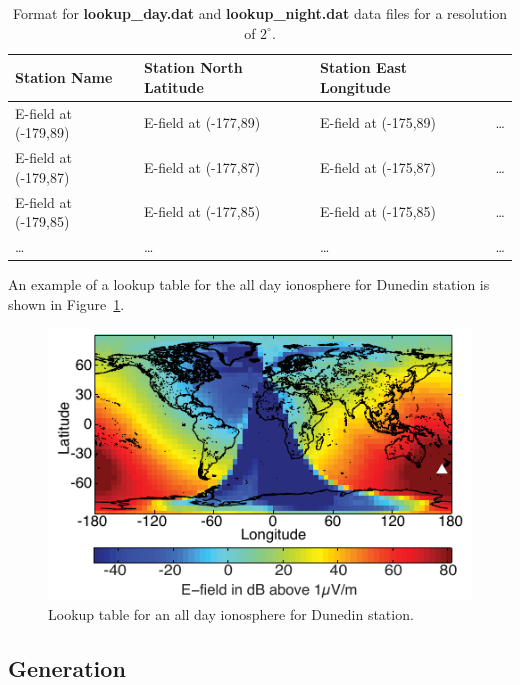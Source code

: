 \begin{table}[h!]
\begin{center}
\begin{tabular}{|p{1.5in}|p{1.75in}|p{1.75in}|p{1in}|}
\hline
\rule{0pt}{3ex}
Station Name	&Station North Latitude	&	Station East Longitude & \\ 
\hline
\rule{0pt}{3ex}
E-field at (-179,89)	& E-field at (-177,89) &	E-field at (-175,89) & \dots \\ 
\hline
\rule{0pt}{3ex}
E-field at (-179,87)	& E-field at (-177,87) &	E-field at (-175,87) & \dots \\ 
\hline
\rule{0pt}{3ex}
E-field at (-179,85)	& E-field at (-177,85) &	E-field at (-175,85) & \dots \\ 
\hline
\rule{0pt}{3ex}
\dots	& \dots &	\dots & \dots \\ 
\hline
\end{tabular}
\end{center}
\caption{Format for \textbf{lookup\_day.dat} and \textbf{lookup\_night.dat} data files for a resolution of $2^\circ$.}
\label{app:table:lookup}
\end{table}

An example of a lookup table for the all day ionosphere for Dunedin station is shown in Figure~\ref{app:fig:lookup}.

\begin{figure}[ht!]
   \centering
   \includegraphics[scale=1]{Energy/Figures/PPS_Lookup.pdf} 
   \caption{Lookup table for an all day ionosphere for Dunedin station.}
   \label{app:fig:lookup}
\end{figure}

\subsection{Generation}

